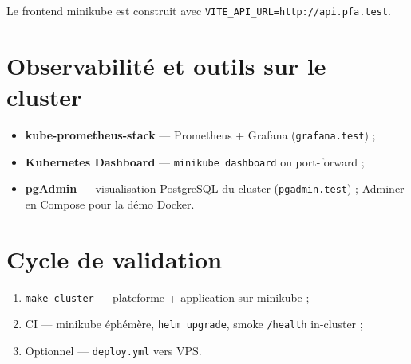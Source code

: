 Le frontend minikube est construit avec \texttt{VITE\_API\_URL=http://api.pfa.test}.

\section{Observabilité et outils sur le cluster}

\begin{itemize}
  \item \textbf{kube-prometheus-stack} — Prometheus + Grafana (\texttt{grafana.test}) ;
  \item \textbf{Kubernetes Dashboard} — \texttt{minikube dashboard} ou port-forward ;
  \item \textbf{pgAdmin} — visualisation PostgreSQL du cluster (\texttt{pgadmin.test}) ; Adminer en Compose pour la démo Docker.
\end{itemize}

\section{Cycle de validation}

\begin{enumerate}
  \item \texttt{make cluster} — plateforme + application sur minikube ;
  \item CI — minikube éphémère, \texttt{helm upgrade}, smoke \texttt{/health} in-cluster ;
  \item Optionnel — \texttt{deploy.yml} vers VPS.
\end{enumerate}
